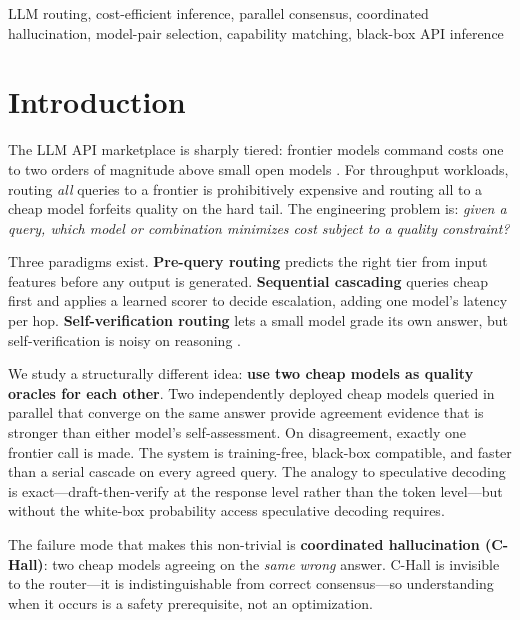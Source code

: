 \documentclass[conference]{IEEEtran}
\begin{document}
\begin{IEEEkeywords}
LLM routing, cost-efficient inference, parallel consensus, coordinated
hallucination, model-pair selection, capability matching, black-box API inference
\end{IEEEkeywords}

\section{Introduction}

The LLM API marketplace is sharply tiered: frontier models command costs one to
two orders of magnitude above small open models \cite{bommasani2021}. For
throughput workloads, routing \textit{all} queries to a frontier is
prohibitively expensive and routing all to a cheap model forfeits quality on the
hard tail. The engineering problem is: \textit{given a query, which model or
combination minimizes cost subject to a quality constraint?}

Three paradigms exist. \textbf{Pre-query routing}
\cite{ong2024routellm,ding2024hybrid} predicts the right tier from input
features before any output is generated. \textbf{Sequential cascading}
\cite{chen2023frugalgpt} queries cheap first and applies a learned scorer to
decide escalation, adding one model's latency per hop.
\textbf{Self-verification routing} \cite{aggarwal2024automix} lets a small model
grade its own answer, but self-verification is noisy on reasoning
\cite{kadavath2022}.

We study a structurally different idea: \textbf{use two cheap models as quality
oracles for each other}. Two independently deployed cheap models queried in
parallel that converge on the same answer provide agreement evidence that is
stronger than either model's self-assessment. On disagreement, exactly one
frontier call is made. The system is training-free, black-box compatible, and
faster than a serial cascade on every agreed query. The analogy to speculative
decoding \cite{leviathan2023,chen2023speculative} is exact---draft-then-verify
at the response level rather than the token level---but without the white-box
probability access speculative decoding requires.

The failure mode that makes this non-trivial is \textbf{coordinated
hallucination (C-Hall)}: two cheap models agreeing on the \textit{same wrong}
answer. C-Hall is invisible to the router---it is indistinguishable from correct
consensus---so understanding when it occurs is a safety prerequisite, not an
optimization.
\end{document}
